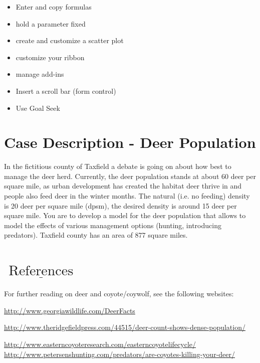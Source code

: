 \documentclass[10pt]{article}
\begin{document}
\begin{itemize}
  \item Enter and copy formulas

  \item hold a parameter fixed

  \item create and customize a scatter plot

  \item customize your ribbon

  \item manage add-ins

  \item Insert a scroll bar (form control)

  \item Use Goal Seek

\end{itemize}
\section{Case Description - Deer Population}
In the fictitious county of Taxfield a debate is going on about how best to manage the deer herd. Currently, the deer population stands at about 60 deer per square mile, as urban development has created the habitat deer thrive in and people also feed deer in the winter months. The natural (i.e. no feeding) density is 20 deer per square mile (dpsm), the desired density is around 15 deer per square mile. You are to develop a model for the deer population that allows to model the effects of various management options (hunting, introducing predators). Taxfield county has an area of 877 square miles.

\section{$\underline{\text { References }}$}
For further reading on deer and coyote/coywolf, see the following websites:

\href{http://www.georgiawildlife.com/DeerFacts}{http://www.georgiawildlife.com/DeerFacts}

\href{http://www.theridgefieldpress.com/44515/deer-count-shows-dense-population/}{http://www.theridgefieldpress.com/44515/deer-count-shows-dense-population/}

\href{http://www.easterncoyoteresearch.com/easterncoyotelifecycle/}{http://www.easterncoyoteresearch.com/easterncoyotelifecycle/} \href{http://www.petersenshunting.com/predators/are-coyotes-killing-your-deer/}{http://www.petersenshunting.com/predators/are-coyotes-killing-your-deer/}
\end{document}
